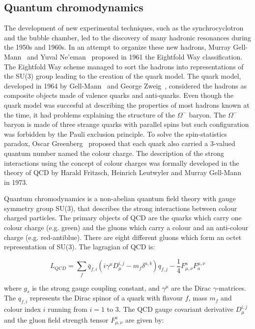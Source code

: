 \subsection{Quantum chromodynamics}\label{sec:QCD}

The development of new experimental techniques, such as the synchrocyclotron and the bubble chamber, led to the discovery of many hadronic resonances during the 1950s and 1960s. In an attempt to organize these new hadrons, Murray Gell-Mann~\cite{EightFoldWay_1} and Yuval Ne'eman~\cite{EightFoldWay_2} proposed in 1961 the Eightfold Way classification. The Eightfold Way scheme managed to sort the hadrons into representations of the SU(3) group leading to the creation of the quark model. The quark model, developed in 1964 by Gell-Mann~\cite{QuarkModel_1} and George Zweig~\cite{QuarkModel_2}, considered the hadrons as composite objects made of valence quarks and anti-quarks. Even though the quark model was succesful at describing the properties of most hadrons known at the time, it had problems explaining the structure of the $\Omega^{-}$ baryon. The $\Omega^{-}$ baryon is made of three strange quarks with parallel spins but such configuration was forbidden by the Pauli exclusion principle. To solve the spin-statistics paradox, Oscar Greenberg~\cite{ColourCharge} proposed that each quark also carried a 3-valued quantum number named the colour charge. The description of the strong interactions using the concept of colour charges was formally developed in the theory of QCD by Harald Fritzsch, Heinrich Leutwyler and Murray Gell-Mann~\cite{QCD} in 1973.

Quantum chromodynamics is a non-abelian quantum field theory with gauge symmetry group SU(3), that describes the strong interactions between colour charged particles. The primary objects of QCD are the quarks which carry one colour charge (e.g. green) and the gluons which carry a colour and an anti-colour charge (e.g. red-antiblue). There are eight different gluons which form an octet representation of SU(3). The lagragian of QCD is:

\begin{equation}
  L_{QCD} = \sum_{f}\bar{q}_{f,i}\left(i\gamma^{\mu}D_{\mu}^{i,j} - m_{f}\delta^{a,b}\right)q_{f,j} - \frac{1}{4}F^{a}_{\mu,\nu}F_{a}^{\mu,\nu}
  \label{eq:QCDLagrangian}
\end{equation}

where $g_{s}$ is the strong gauge coupling constant, and $\gamma^{\mu}$ are the Dirac $\gamma$-matrices. The $q_{f,i}$ represents the Dirac spinor of a quark with flavour $f$, mass $m_{f}$ and colour index $i$ running from $i=1$ to 3. The QCD gauge covariant derivative $D_{\mu}^{i,j}$ and the gluon field strength tensor $F^{a}_{\mu,\nu}$ are given by:

